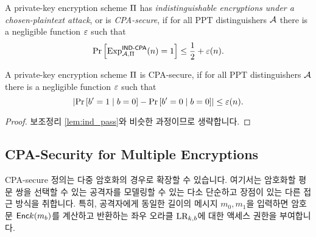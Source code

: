 \begin{definition} 
  A private-key encryption scheme $\Pi$ has \emph{indistinguishable encryptions
  under a chosen-plaintext attack}, or is \emph{CPA-secure}, if for all PPT
  distinguishers $\mathcal{A}$ there is a negligible function $\varepsilon$ such that
  \begin{equation}
    \text{Pr} \left[ \text{Exp}^{\textsf{IND-CPA}}_{\mathcal{A}, \Pi}(n) = 1 \right] \le \frac{1}{2} + \varepsilon(n).
  \end{equation}
  \label{def:ind_cpa}
\end{definition}

\begin{lemma}
  A private-key encryption scheme $\Pi$ is CPA-secure, if for all PPT
  distinguishers $\mathcal{A}$ there is a negligible function $\varepsilon$ such that
  \begin{equation}
    \left| \text{Pr} \left[ b' = 1 \;|\; b = 0 \right] - \text{Pr} \left[ b' = 0 \;|\; b = 0 \right] \right| \le \varepsilon(n).
  \end{equation}
  \label{lem:ind_cpa}
\end{lemma}

\begin{proof}
  보조정리 \ref{lem:ind_pass}와 비슷한 과정이므로 생략합니다.
\end{proof}

\subsection*{CPA-Security for Multiple Encryptions}

CPA-secure 정의는 다중 암호화의 경우로 확장할 수 있습니다. 여기서는 암호화할
평문 쌍을 선택할 수 있는 공격자를 모델링할 수 있는 다소 단순하고 장점이 있는
다른 접근 방식을 취합니다. 특히, 공격자에게 동일한 길이의 메시지 $m_0, m_1$을
입력하면 암호문 $\textsf{Enc}{k}(m_b)$를 계산하고 반환하는 좌우 오라클 $\text{LR}_{k, b}$에
대한 액세스 권한을 부여합니다.


